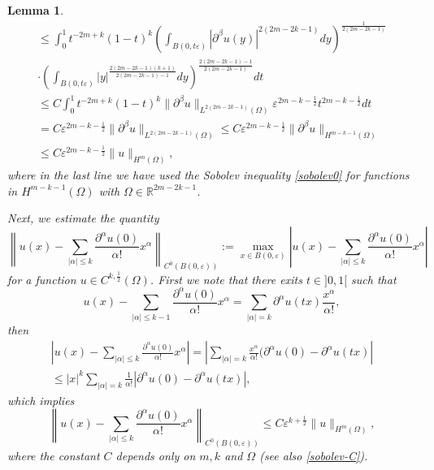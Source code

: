 \documentclass[11pt,a4paper]{amsart}
\numberwithin{equation}{section}
\newtheorem{lemma}[equation]{Lemma}
\begin{document}
\begin{lemma}
\begin{multline}
\leq \int_0^1t^{-2m+k}(1-t)^k \left(\int_{B(0,t\varepsilon)}|\partial^{\beta}u(y)|^{2 (2m-2k-1)}dy\right)^{\frac{1}{2(2m-2k-1)}}\\
\cdot\left(\int_{B(0,t\varepsilon)}|y|^{\frac{2(2m-2k-1)(k+1)}{2(2m-2k-1)-1}}dy\right)^{\frac{2(2m-2k-1)-1}{2(2m-2k-1)}}dt\\
\leq C\int_0^1t^{-2m+k}(1-t)^k \|\partial^{\beta}u\|_{L^{2(2m-2k-1)}(\Omega)}\varepsilon^{2m-k-\frac{1}{2}}t^{2m-k-\frac{1}{2}}dt\\
=C\varepsilon^{2m-k-\frac{1}{2}}\|\partial^{\beta}u\|_{L^{2(2m-2k-1)}(\Omega)}\leq C\varepsilon^{2m-k-\frac{1}{2}}\|\partial^{\beta}u\|_{H^{m-k-1}(\Omega)} \\
\leq C\varepsilon^{2m-k-\frac{1}{2}}\|u\|_{H^{m}(\Omega)},
\end{multline}
where in the last line we have used the Sobolev inequality \eqref{sobolev0} for functions in $H^{m-k-1}(\Omega)$ with $\Omega\in\mathbb R^{2m-2k-1}$.


Next, we estimate the quantity 
$$
\left\|u(x)-\sum_{|\alpha|\leq k}\frac{\partial^{\alpha}u(0)}{\alpha!}x^{\alpha}\right\|_{C^{0}(B(0,\varepsilon))}:=\max_{x\in B(0,\varepsilon)}\left|u(x)-\sum_{|\alpha|\leq k}\frac{\partial^{\alpha}u(0)}{\alpha!}x^{\alpha}\right|
$$
for a function $u\in C^{k,\frac{1}{2}}(\Omega)$. First we note that there exits $t\in]0,1[$ such that
\begin{equation*}
u(x)-\sum_{|\alpha|\leq {k-1}}\frac{\partial^{\alpha}u(0)}{\alpha!}x^{\alpha}=\sum_{|\alpha|=k}\partial^{\alpha}u(tx)\frac{x^{\alpha}}{\alpha!},
\end{equation*}
then
\begin{multline*}%
\left|u(x)-\sum_{|\alpha|\leq k}\frac{\partial^{\alpha}u(0)}{\alpha!}x^{\alpha}\right|=\left|\sum_{|\alpha|=k}\frac{x^{\alpha}}{\alpha !}(\partial^{\alpha}u(0)-\partial^{\alpha}u(tx)\right|\\
\leq |x|^k\sum_{|\alpha|=k}\frac{1}{\alpha !}|\partial^{\alpha}u(0)-\partial^{\alpha}u(tx)|,
\end{multline*}
which implies
\begin{equation}\label{unif-1}
\left\|u(x)-\sum_{|\alpha|\leq k}\frac{\partial^{\alpha}u(0)}{\alpha!}x^{\alpha}\right\|_{C^{0}(B(0,\varepsilon))}\leq C\varepsilon^{k+\frac{1}{2}}\|u\|_{H^m(\Omega)},
\end{equation}
where the constant $C$ depends only on $m,k$ and $\Omega$ (see also \eqref{sobolev-C}).


\end{lemma}
\end{document}
